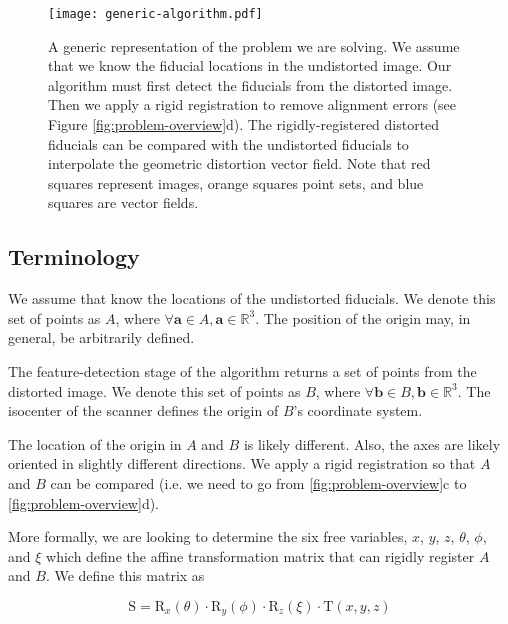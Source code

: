 \documentclass[12pt]{article}
\begin{document}
\begin{figure}
    \centering
    \texttt{[image: generic-algorithm.pdf]}
    \caption{A generic representation of the problem we are solving. We assume that we know the fiducial locations in the undistorted image.  Our algorithm must first detect the fiducials from the distorted image.  Then we apply a rigid registration to remove alignment errors (see Figure \ref{fig:problem-overview}d). The rigidly-registered distorted fiducials can be compared with the undistorted fiducials to interpolate the geometric distortion vector field.  Note that red squares represent images, orange squares point sets, and blue squares are vector fields.}
    \label{fig:generic-algorithm}
\end{figure}

\subsection{Terminology}

We assume that know the locations of the undistorted fiducials.  We denote this set of points as $A$, where $\forall \mathbf{a} \in A, \mathbf{a} \in \mathbb{R}^3$.  The position of the origin may, in general, be arbitrarily defined.

The feature-detection stage of the algorithm returns a set of points from the distorted image.  We denote this set of points as $B$, where $\forall \mathbf{b} \in B, \mathbf{b} \in \mathbb{R}^3$.  The isocenter of the scanner defines the origin of $B$'s coordinate system. 

The location of the origin in $A$ and $B$ is likely different.  Also, the axes are likely oriented in slightly different directions.  We apply a rigid registration so that $A$ and $B$ can be compared (i.e. we need to go from \ref{fig:problem-overview}c to \ref{fig:problem-overview}d).

More formally, we are looking to determine the six free variables, $x$, $y$, $z$, $\theta$, $\phi$, and $\xi$ which define the affine transformation matrix that can rigidly register $A$ and $B$.  We define this matrix as

$$
\mathrm{S} = \mathrm{R}_x(\theta) \cdot \mathrm{R}_y(\phi) \cdot \mathrm{R}_z(\xi) \cdot \mathrm{T}(x, y, z)
$$
\end{document}
